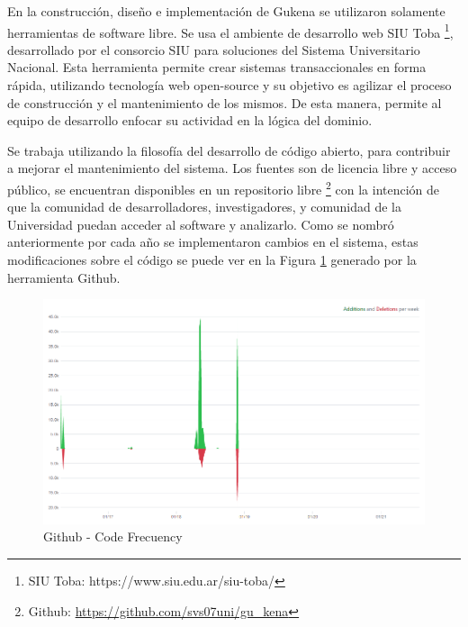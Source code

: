 En la construcción, diseño e implementación de Gukena se utilizaron solamente herramientas de software libre. Se usa el ambiente de desarrollo web SIU Toba \footnote{SIU Toba: https://www.siu.edu.ar/siu-toba/}, desarrollado por el consorcio SIU para soluciones del Sistema Universitario Nacional. Esta herramienta  permite crear sistemas transaccionales en forma rápida, utilizando tecnología web open-source y su objetivo es agilizar el proceso de construcción y el mantenimiento de los mismos. De esta manera, permite al equipo de desarrollo enfocar su actividad en la lógica del dominio.  

Se trabaja utilizando la filosofía del desarrollo de código abierto, para contribuir a mejorar el mantenimiento del sistema. Los fuentes son de licencia libre y acceso público, se encuentran disponibles en un repositorio libre
\footnote{Github: \url{https://github.com/svs07uni/gu_kena}} 
con la intención  de que la comunidad de desarrolladores, investigadores, y comunidad de la Universidad puedan acceder al software y analizarlo.
Como se nombró anteriormente por cada año se implementaron cambios en el sistema, estas modificaciones sobre el código se puede ver en la Figura \ref{graf:codeFrecuency} generado por la herramienta Github.

\begin{figure}[h!]
    \begin{center}
        \includegraphics[width=\textwidth]{img/graficoGithub.png}
    \end{center}
  \caption{Github - Code Frecuency}
  \label{graf:codeFrecuency}
\end{figure}

